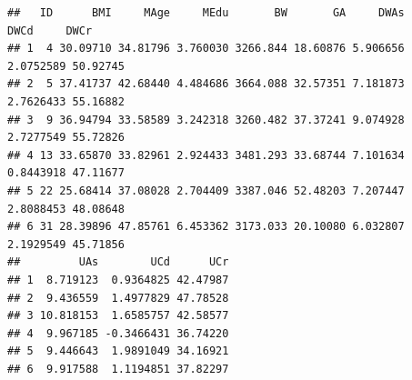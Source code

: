 \documentclass[
]{book}
\newenvironment{Shaded}{\begin{snugshade}}{\end{snugshade}}
\newcommand{\CommentTok}[1]{\textcolor[rgb]{0.56,0.35,0.01}{\textit{#1}}}
\newcommand{\DataTypeTok}[1]{\textcolor[rgb]{0.13,0.29,0.53}{#1}}
\newcommand{\DecValTok}[1]{\textcolor[rgb]{0.00,0.00,0.81}{#1}}
\newcommand{\KeywordTok}[1]{\textcolor[rgb]{0.13,0.29,0.53}{\textbf{#1}}}
\newcommand{\NormalTok}[1]{#1}
\newcommand{\OperatorTok}[1]{\textcolor[rgb]{0.81,0.36,0.00}{\textbf{#1}}}
\newcommand{\StringTok}[1]{\textcolor[rgb]{0.31,0.60,0.02}{#1}}
\begin{document}
\begin{Shaded}
\end{Shaded}

\begin{verbatim}
##   ID      BMI     MAge     MEdu       BW       GA     DWAs      DWCd     DWCr
## 1  4 30.09710 34.81796 3.760030 3266.844 18.60876 5.906656 2.0752589 50.92745
## 2  5 37.41737 42.68440 4.484686 3664.088 32.57351 7.181873 2.7626433 55.16882
## 3  9 36.94794 33.58589 3.242318 3260.482 37.37241 9.074928 2.7277549 55.72826
## 4 13 33.65870 33.82961 2.924433 3481.293 33.68744 7.101634 0.8443918 47.11677
## 5 22 25.68414 37.08028 2.704409 3387.046 52.48203 7.207447 2.8088453 48.08648
## 6 31 28.39896 47.85761 6.453362 3173.033 20.10080 6.032807 2.1929549 45.71856
##         UAs        UCd      UCr
## 1  8.719123  0.9364825 42.47987
## 2  9.436559  1.4977829 47.78528
## 3 10.818153  1.6585757 42.58577
## 4  9.967185 -0.3466431 36.74220
## 5  9.446643  1.9891049 34.16921
## 6  9.917588  1.1194851 37.82297
\end{verbatim}
\end{document}
